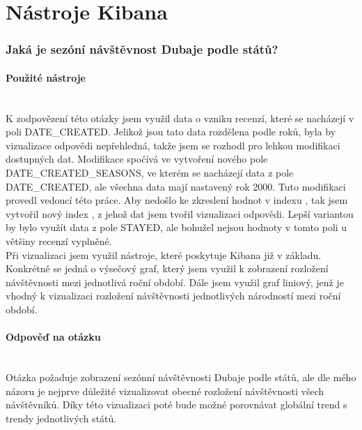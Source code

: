 \documentclass[czech,BP]{thesiskiv}
\begin{document}
\section{Nástroje Kibana}
\subsubsection{Jaká je sezóní návštěvnost Dubaje podle států?}
\label{subsub:Návštěvnost}
\paragraph{Použité nástroje}
\mbox{}\\
K zodpovězení této otázky jsem využil data o vzniku recenzí, které se nacházejí v poli DATE\_CREATED. Jelikož jsou tato data rozdělena podle roků, byla by vizualizace odpovědi nepřehledná, takže jsem se rozhodl pro lehkou modifikaci dostupných dat. Modifikace spočívá ve vytvoření nového pole DATE\_CREATED\_SEASONS, ve kterém se nacházejí data z pole DATE\_CREATED, ale všechna data mají nastavený rok 2000. Tuto modifikaci provedl vedoucí této práce. Aby nedošlo ke zkreslení hodnot v indexu , tak jsem vytvořil nový index , z jehož dat jsem tvořil vizualizaci odpovědi. Lepší variantou by bylo využít data z pole STAYED, ale bohužel nejsou hodnoty v tomto poli u většiny recenzí vyplněné. 
\\
Při vizualizaci jsem využil nástroje, které poskytuje Kibana již v základu. Konkrétně se jedná o výsečový graf, který jsem využil k zobrazení rozložení návštěvnosti mezi jednotlivá roční období. Dále jsem využil graf liniový, jenž je vhodný k vizualizaci rozložení návštěvnosti jednotlivých národností mezi roční období.

\paragraph{Odpověď na otázku}
\mbox{}\\
Otázka požaduje zobrazení sezónní návštěvnosti Dubaje podle států, ale dle mého názoru je nejprve důležité vizualizovat obecné rozložení návštěvnosti všech návštěvníků. Díky této vizualizaci poté bude možné porovnávat globální trend s trendy jednotlivých států.
\vspace{2cm}
\end{document}
